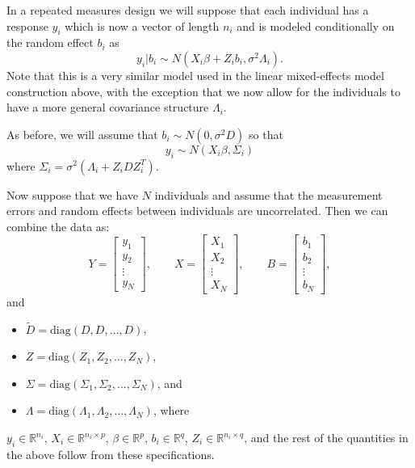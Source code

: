 \documentclass[
  ignorenonframetext,
]{beamer}
\begin{document}
\begin{frame}{}
\protect\hypertarget{section-16}{}
In a repeated measures design we will suppose that each individual has a
response \(y_i\) which is now a vector of length \(n_i\) and is modeled
conditionally on the random effect \(b_i\) as \[
  y_i | b_i \sim N(X_i\beta + Z_i b_i, \sigma^2 \Lambda_i).
\] Note that this is a very similar model used in the linear
mixed-effects model construction above, with the exception that we now
allow for the individuals to have a more general covariance structure
\(\Lambda_i\).

As before, we will assume that \(b_i \sim N(0, \sigma^2 D)\) so that \[
  y_i \sim N(X_i\beta, \Sigma_i)
\] where \(\Sigma_i = \sigma^2(\Lambda_i + Z_iDZ_i^T)\).
\end{frame}

\begin{frame}{}
\protect\hypertarget{section-17}{}
Now suppose that we have \(N\) individuals and assume that the
measurement errors and random effects between individuals are
uncorrelated. Then we can combine the data as: \[
  Y = \left[\begin{array}{c}
  y_1 \\
  y_2 \\
  \vdots \\
  y_N
  \end{array}\right], \qquad 
  X = \left[\begin{array}{c}
  X_1 \\
  X_2 \\
  \vdots \\
  X_N
  \end{array}\right], \qquad
  B = \left[\begin{array}{c}
  b_1 \\
  b_2 \\
  \vdots \\
  b_N
  \end{array}\right],
\] and

\begin{itemize}
\item
  \(\tilde{D} = \text{diag}(D,D,\ldots,D)\),
\item
  \(Z = \text{diag}(Z_1,Z_2,\ldots,Z_N)\),
\item
  \(\Sigma = \text{diag}(\Sigma_1,\Sigma_2,\ldots,\Sigma_N)\), and
\item
  \(\Lambda = \text{diag}(\Lambda_1,\Lambda_2,\ldots,\Lambda_N)\), where
\end{itemize}

\(y_i \in \mathbb{R}^{n_i}\), \(X_i \in \mathbb{R}^{n_i\times p}\),
\(\beta \in \mathbb{R}^p\), \(b_i \in \mathbb{R}^{q}\),
\(Z_i \in \mathbb{R}^{n_i \times q}\), and the rest of the quantities in
the above follow from these specifications.
\end{frame}
\end{document}
